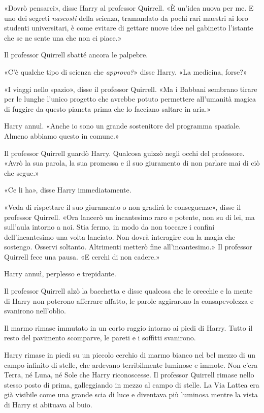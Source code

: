 «Dovrò pensarci», disse Harry al professor Quirrell. «È un’idea nuova per me. E uno dei segreti \textit{nascosti} della scienza, tramandato da pochi rari maestri ai loro studenti universitari, è come evitare di gettare nuove idee nel gabinetto l’istante che se ne sente una che non ci piace.»

Il professor Quirrell sbatté ancora le palpebre.

«C’è qualche tipo di scienza che \textit{approva?}» disse Harry. «La medicina, forse?»

«I viaggi nello spazio», disse il professor Quirrell. «Ma i Babbani sembrano tirare per le lunghe l’unico progetto che avrebbe potuto permettere all’umanità magica di fuggire da questo pianeta prima che lo facciano saltare in aria.»

Harry annuì. «Anche io sono un grande sostenitore del programma spaziale. Almeno abbiamo questo in comune.»

Il professor Quirrell guardò Harry. Qualcosa guizzò negli occhi del professore. «Avrò la sua parola, la sua promessa e il suo giuramento di non parlare mai di ciò che segue.»

«Ce li ha», disse Harry immediatamente.

«Veda di rispettare il suo giuramento o non gradirà le conseguenze», disse il professor Quirrell. «Ora lancerò un incantesimo raro e potente, non su di lei, ma sull’aula intorno a noi. Stia fermo, in modo da non toccare i confini dell’incantesimo una volta lanciato. Non dovrà interagire con la magia che sostengo. Osservi soltanto. Altrimenti metterò fine all’incantesimo.» Il professor Quirrell fece una pausa. «E cerchi di non cadere.»

Harry annuì, perplesso e trepidante.

Il professor Quirrell alzò la bacchetta e disse qualcosa che le orecchie e la mente di Harry non poterono afferrare affatto, le parole aggirarono la consapevolezza e svanirono nell’oblio.

Il marmo rimase immutato in un corto raggio intorno ai piedi di Harry. Tutto il resto del pavimento scomparve, le pareti e i soffitti svanirono.

Harry rimase in piedi su un piccolo cerchio di marmo bianco nel bel mezzo di un campo infinito di stelle, che ardevano terribilmente luminose e immote. Non c’era Terra, né Luna, né Sole che Harry riconoscesse. Il professor Quirrell rimase nello stesso posto di prima, galleggiando in mezzo al campo di stelle. La Via Lattea era già visibile come una grande scia di luce e diventava più luminosa mentre la vista di Harry si abituava al buio.

